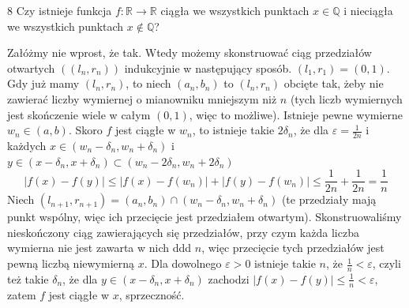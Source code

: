 \documentclass{../note}
\begin{document}
\begin{zadanie}{8}
Czy istnieje funkcja $f:\mathbb{R}\rightarrow\mathbb{R}$ ciągła we wszystkich punktach $x\in\mathbb{Q}$ i nieciągła we wszystkich punktach $x\notin\mathbb{Q}$? %
\end{zadanie}
\begin{rozwiazanie}
Załóżmy nie wprost, że tak. Wtedy możemy skonstruować ciąg przedziałów otwartych $((l_n, r_n))$ indukcyjnie w następujący sposób. $(l_1, r_1) = (0, 1)$. Gdy już mamy $(l_n, r_n)$, to niech $(a_n, b_n)$ to $(l_n, r_n)$ obcięte tak, żeby nie zawierać liczby wymiernej o mianowniku mniejszym niż $n$ (tych liczb wymiernych jest skończenie wiele w całym $(0, 1)$, więc to możliwe). Istnieje pewne wymierne $w_n \in (a, b)$. Skoro $f$ jest ciągłe w $w_n$, to istnieje takie $2\delta_n$, że dla $\varepsilon=\frac{1}{2n}$ i każdych $x \in (w_n - \delta_n, w_n + \delta_n)$ i $y \in (x - \delta_n, x + \delta_n) \subset (w_n - 2\delta_n, w_n + 2\delta_n)$
\[|f(x) - f(y)| \leq |f(x) - f(w_n)| + |f(y) - f(w_n)| \leq \frac{1}{2n} + \frac{1}{2n} = \frac1n\]
Niech $(l_{n+1}, r_{n+1})=(a_n, b_n)\cap (w_n - \delta_n, w_n + \delta_n)$ (te przedziały mają punkt wspólny, więc ich przecięcie jest przedziałem otwartym). Skonstruowaliśmy nieskończony ciąg zawierających się przedziałów, przy czym każda liczba wymierna nie jest zawarta w nich ddd $n$, więc przecięcie tych przedziałów jest pewną liczbą niewymierną $x$. Dla dowolnego $\varepsilon > 0$ istnieje takie $n$, że $\frac1n < \varepsilon$, czyli też takie $\delta_n$, że dla $y \in (x - \delta_n, x + \delta_n)$ zachodzi $|f(x) - f(y)| \leq \frac1n < \varepsilon$, zatem $f$ jest ciągłe w $x$, sprzeczność.
\end{rozwiazanie}
\end{document}
